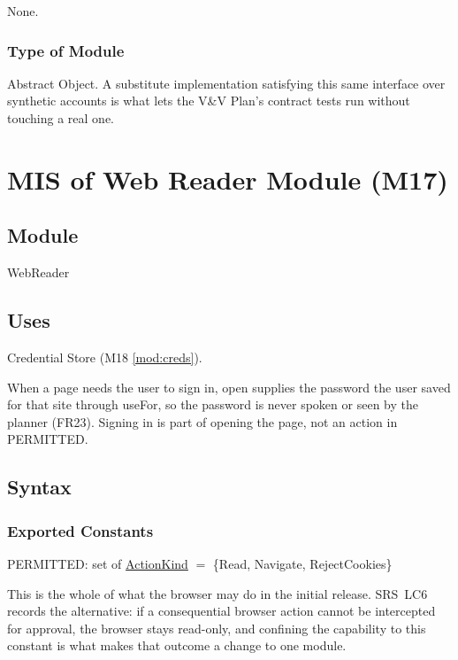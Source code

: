 \documentclass[12pt, titlepage]{article}
\begin{document}
None.

\subsubsection{Type of Module}

Abstract Object. A substitute implementation satisfying this same interface
over synthetic accounts is what lets the V\&V Plan's contract tests run without
touching a real one.

\newpage

\section{MIS of Web Reader Module (M17)} \label{mod:web}

\subsection{Module}

WebReader

\subsection{Uses}

Credential Store (M18 \ref{mod:creds}).

\noindent When a page needs the user to sign in, open supplies the password the
user saved for that site through useFor, so the password is never spoken or seen
by the planner (FR23). Signing in is part of opening the page, not an action in
PERMITTED.

\subsection{Syntax}

\subsubsection{Exported Constants}

PERMITTED: set of \hyperref[type:ActionKind]{ActionKind} $=$ \{Read, Navigate,
RejectCookies\}

\noindent This is the whole of what the browser may do in the initial release.
SRS~LC6 records the alternative: if a consequential browser action cannot be
intercepted for approval, the browser stays read-only, and confining the
capability to this constant is what makes that outcome a change to one module.
\end{document}

